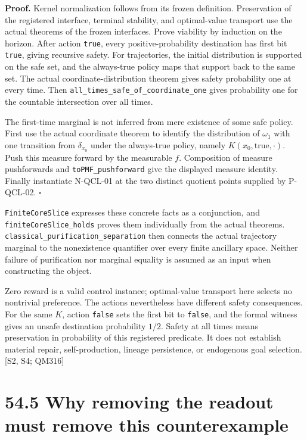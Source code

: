 \documentclass[
  11pt,
  oneside]{book}
\begin{document}
\textbf{Proof.} Kernel normalization follows from its frozen definition.
Preservation of the registered interface, terminal stability, and
optimal-value transport use the actual theorems of the frozen
interfaces. Prove viability by induction on the horizon. After action
\texttt{true}, every positive-probability destination has first bit
\texttt{true}, giving recursive safety. For trajectories, the initial
distribution is supported on the safe set, and the always-true policy
maps that support back to the same set. The actual
coordinate-distribution theorem gives safety probability one at every
time. Then \texttt{all\_\allowbreak times\_\allowbreak safe\_\allowbreak of\_\allowbreak coordinate\_\allowbreak one} gives
probability one for the countable intersection over all times.

The first-time marginal is not inferred from mere existence of some safe
policy. First use the actual coordinate theorem to identify the
distribution of \(\omega_1\) with one transition from \(\delta_{x_0}\)
under the always-true policy, namely \(K(x_0,\mathrm{true},\cdot)\).
Push this measure forward by the measurable \(f\). Composition of
measure pushforwards and \texttt{to\allowbreak PMF\_\allowbreak pushforward} give the displayed
measure identity. Finally instantiate N-QCL-01 at the two distinct
quotient points supplied by P-QCL-02. \(\square\)

\texttt{Finite\allowbreak Core\allowbreak Slice} expresses these concrete facts as a
conjunction, and \texttt{finite\allowbreak Core\allowbreak Slice\_\allowbreak holds} proves them
individually from the actual theorems.
\texttt{classical\_\allowbreak purification\_\allowbreak separation} then connects the actual
trajectory marginal to the nonexistence quantifier over every finite
ancillary space. Neither failure of purification nor marginal equality
is assumed as an input when constructing the object.

Zero reward is a valid control instance; optimal-value transport here
selects no nontrivial preference. The actions nevertheless have
different safety consequences. For the same \(K\), action \texttt{false}
sets the first bit to \texttt{false}, and the formal witness gives an
unsafe destination probability \(1/2\). Safety at all times means
preservation in probability of this registered predicate. It does not
establish material repair, self-production, lineage persistence, or
endogenous goal selection. {[}S2, S4; QM316{]}

\section{54.5 Why removing the readout must remove this counterexample}
\end{document}
